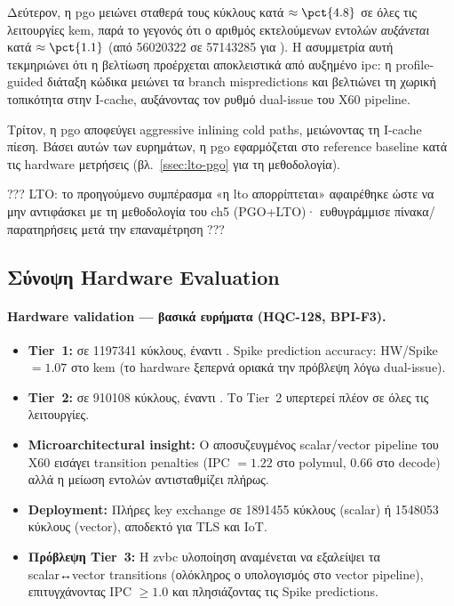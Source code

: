 Δεύτερον, η \gls{pgo} μειώνει σταθερά τους κύκλους κατά $\approx\pct{4.8}$
σε όλες τις λειτουργίες \gls{kem}, παρά το γεγονός ότι ο αριθμός εκτελούμενων
εντολών \emph{αυξάνεται} κατά $\approx\pct{1.1}$ (από \num{56020322} σε
\num{57143285} για \Decaps). Η ασυμμετρία αυτή τεκμηριώνει ότι η βελτίωση
προέρχεται αποκλειστικά από αυξημένο \gls{ipc}: η profile-guided
διάταξη κώδικα μειώνει τα branch mispredictions και βελτιώνει τη χωρική
τοπικότητα στην I-cache, αυξάνοντας τον ρυθμό dual-issue του X60 pipeline.

Τρίτον, η \gls{pgo} αποφεύγει aggressive
inlining cold paths, μειώνοντας τη I-cache πίεση. Βάσει αυτών των ευρημάτων,
η \gls{pgo} εφαρμόζεται στο reference baseline κατά τις hardware μετρήσεις
(βλ.\ \cref{ssec:lto-pgo} για τη μεθοδολογία).

??? LTO: το προηγούμενο συμπέρασμα «η \gls{lto} απορρίπτεται» αφαιρέθηκε 
ώστε να μην αντιφάσκει με τη μεθοδολογία του ch5 (PGO+LTO)· ευθυγράμμισε 
πίνακα/παρατηρήσεις μετά την επαναμέτρηση ???
\fi

\subsection{Σύνοψη Hardware Evaluation}
\label{ssec:hw-summary}

\paragraph{Hardware validation — βασικά ευρήματα (HQC-128, BPI-F3).}
\begin{itemize}
    \item \textbf{Tier~1:} \Decaps σε
      \num{1197341} κύκλους,  έναντι .
      Spike prediction accuracy: HW/Spike $= 1.07$ στο \gls{kem} (το hardware ξεπερνά οριακά την πρόβλεψη λόγω dual-issue).
    \item \textbf{Tier~2:} \Decaps σε
      \num{910108} κύκλους,  έναντι .
      Το Tier~2 υπερτερεί πλέον σε όλες τις λειτουργίες.
    \item \textbf{Microarchitectural insight:} Ο αποσυζευγμένος
      scalar/vector pipeline του X60 εισάγει transition penalties
      (IPC $= 1.22$ στο polymul, $0.66$ στο decode) αλλά η μείωση
      εντολών αντισταθμίζει πλήρως.
    \item \textbf{Deployment:} Πλήρες key exchange σε
      \num{1891455} κύκλους (scalar) ή \num{1548053} κύκλους (vector), αποδεκτό για TLS και IoT.
    \item \textbf{Πρόβλεψη Tier~3:} Η \gls{zvbc} υλοποίηση αναμένεται να
      εξαλείψει τα scalar↔vector transitions (ολόκληρος ο υπολογισμός
      στο vector pipeline), επιτυγχάνοντας IPC $\geq 1.0$ και
      πλησιάζοντας τις Spike predictions.
  \end{itemize}

